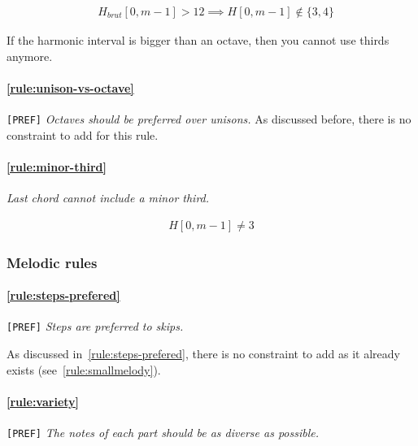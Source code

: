     \begin{equation} \begin{aligned}
    &H_{brut}[0, m-1] > 12 \implies H[0, m-1] \notin \{3, 4\}
    \end{aligned} \end{equation}

    If the harmonic interval is bigger than an octave, then you cannot use thirds anymore.

    \paragraph{\hspace{.6cm}\ref{rule:unison-vs-octave}} \texttt{[PREF]} \textit{Octaves should be preferred over unisons.}
    As discussed before, there is no constraint to add for this rule.

    \paragraph{\hspace{.6cm}\ref{rule:minor-third}}  \textit{Last chord cannot include a minor third.}

    \begin{equation} \begin{aligned}
    H[0, m-1] \neq 3
    \end{aligned} \end{equation}

\subsubsection{Melodic rules}
\paragraph{\hspace{.6cm}\ref{rule:steps-prefered}} \texttt{[PREF]} \textit{Steps are preferred to skips.}

As discussed in~\ref{rule:steps-prefered}, there is no constraint to add as it already exists (see~\ref{rule:smallmelody}).

\paragraph{\hspace{.6cm}\ref{rule:variety}} \texttt{[PREF]}  \textit{The notes of each part should be as diverse as possible.}

